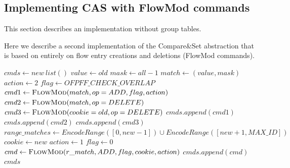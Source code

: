 \documentclass[conference]{sigcomm-alternate}
\newcommand{\concat}[0]{\oplus}
\begin{document}
\begin{appendix}

\section{Implementing CAS with FlowMod commands}\label{sec:without-groups}

This section describes an implementation without group tables.


Here we describe a second implementation of the Compare\&Set abstraction that is based on entirely on flow entry creations and deletions (FlowMod commands). 

\begin{algorithm}[H]
    \caption{$\textit{CAS}(old,new)$}
    \label{alg:cas2}
    \begin{algorithmic}[1]
			\State $cmds \gets new\ list()$
    		\State $value \gets  old$
    		\State $mask \gets  all-1$
    		\State $match \gets (value,mask)$
    		\State $action \gets 2$
    		\State $flag \gets OFPFF\_CHECK\_OVERLAP$
    		\State $cmd1\gets \textsc{FlowMod}(match, op = ADD, flag, action) $
    		\State $cmd2\gets \textsc{FlowMod}(match, op = DELETE) $
    		\State $cmd3\gets \textsc{FlowMod}(cookie = old, op = DELETE) $
    		\State $cmds.append(cmd1)$
    		\State $cmds.append(cmd2)$
    		\State $cmds.append(cmd3)$
    		\State $range\_matches \gets EncodeRange([0,new-1])\cup EncodeRange([new+1,MAX\_ID])$
    		    		\State $cookie \gets new$
    		    		\State $action \gets 1$
    		    		\State $flag \gets 0$
    		    		\State $cmd\gets \textsc{FlowMod}(r\_match, ADD, flag, cookie, action) $
    		    		\State $cmds.append(cmd)$
    		\EndFor
			\Return $cmds$
    \end{algorithmic}
\end{algorithm}

\end{appendix}
\end{document}
